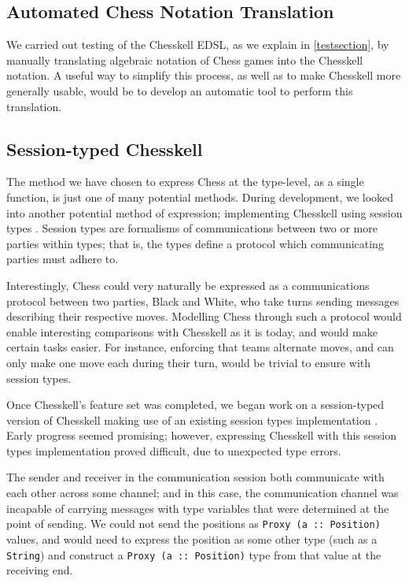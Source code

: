 \documentclass[12pt, a4paper, bibliography=totocnumbered]{scrreprt}
\newcommand{\inline}[1]{\lstinline[basicstyle=\ttfamily\footnotesize]{#1}}
\begin{document}
\subsection{Automated Chess Notation Translation}

We carried out testing of the Chesskell EDSL, as we explain in \cref{testsection}, by manually translating algebraic notation of Chess games into the Chesskell notation. A useful way to simplify this process, as well as to make Chesskell more generally usable, would be to develop an automatic tool to perform this translation.

\subsection{Session-typed Chesskell}

The method we have chosen to express Chess at the type-level, as a single function, is just one of many potential methods. During development, we looked into another potential method of expression; implementing Chesskell using session types \cite{torinosessions}. Session types are formalisms of communications between two or more parties within types; that is, the types define a protocol which communicating parties must adhere to.

Interestingly, Chess could very naturally be expressed as a communications protocol between two parties, Black and White, who take turns sending messages describing their respective moves. Modelling Chess through such a protocol would enable interesting comparisons with Chesskell as it is today, and would make certain tasks easier. For instance, enforcing that teams alternate moves, and can only make one move each during their turn, would be trivial to ensure with session types.

Once Chesskell's feature set was completed, we began work on a session-typed version of Chesskell making use of an existing session types implementation \cite{sesstypesincloudhaskell}. Early progress seemed promising; however, expressing Chesskell with this session types implementation proved difficult, due to unexpected type errors.

The sender and receiver in the communication session both communicate with each other across some channel; and in this case, the communication channel was incapable of carrying messages with type variables that were determined at the point of sending. We could not send the positions as \inline{Proxy (a :: Position)} values, and would need to express the position as some other type (such as a \inline{String}) and construct a \inline{Proxy (a :: Position)} type from that value at the receiving end.
\end{document}
